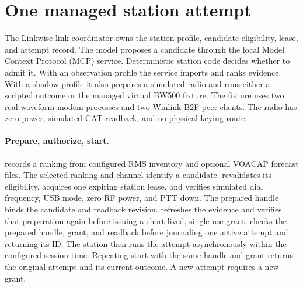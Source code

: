 \section{One managed station attempt}
\label{sec:managed-bw500}

The Linkwise link coordinator owns the station profile, candidate eligibility,
lease, and attempt record. The model proposes a candidate through the local
Model Context Protocol (MCP) service. Deterministic station code decides whether
to admit it. With an observation profile the service imports and ranks
evidence. With a shadow profile it also prepares a simulated radio and runs
either a scripted outcome or the managed virtual BW500 fixture. The fixture
uses two real waveform modem processes and two Winlink B2F peer clients. The
radio has zero power, simulated CAT readback, and no physical keying route.


\paragraph{Prepare, authorize, start.}
 records a ranking from configured RMS inventory and
optional VOACAP forecast files. The selected ranking and channel identify a
candidate.  revalidates its eligibility, acquires
one expiring station lease, and verifies simulated dial frequency, USB mode,
zero RF power, and PTT down. The prepared handle binds the candidate and
readback revision.  refreshes the
evidence and verifies that preparation again before issuing a short-lived,
single-use grant.  checks the prepared handle,
grant, and readback before journaling one active attempt and returning its ID.
The station then runs the attempt asynchronously within the configured
session time. Repeating start with the same handle and grant returns the
original attempt and its current outcome. A new attempt requires a new grant.

